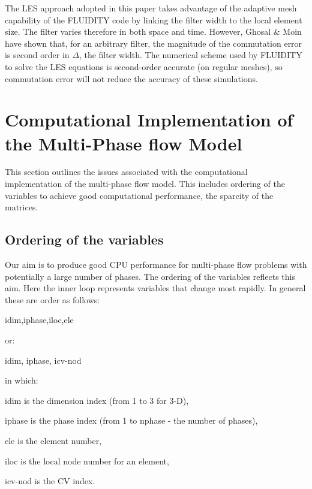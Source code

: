 The LES approach adopted in this paper takes advantage of the
adaptive mesh capability of the FLUIDITY code by linking the
filter width to the local element size. The filter varies
therefore in both space and time. However, Ghosal \& Moin
\cite{GnM95} have shown that, for an arbitrary filter, the
magnitude of the commutation error is second order in $\Delta$,
the filter width. The numerical scheme used by FLUIDITY to solve
the LES equations is second-order accurate (on regular meshes), so
commutation error will not reduce the accuracy of these
simulations.





\pagebreak



\section{Computational Implementation of the Multi-Phase flow Model}
\label{Computational Implementation} 

This section outlines the issues associated with the 
computational implementation of the multi-phase flow model. 
This includes ordering of the variables to achieve good computational 
performance, the sparcity of the matrices. 

\subsection{Ordering of the variables}
\label{Ordering} 
Our aim is to produce good CPU performance for multi-phase flow 
problems with potentially a large number of phases. The ordering of 
the variables reflects this aim. Here the inner loop represents variables that 
change most rapidly. 
In general these are order as follows: 

\par\noindent
idim,iphase,iloc,ele

\par\noindent
or:


\par\noindent
idim, iphase, icv-nod

\par\noindent
in which:
\par\noindent
 idim is the dimension index (from 1 to 3 for 3-D), 
\par\noindent
iphase is the phase index (from 1 to nphase - the number of phases), 
\par\noindent
ele is the element number, 
\par\noindent
iloc is the local node number for an element, 
\par\noindent
icv-nod is the CV index.

